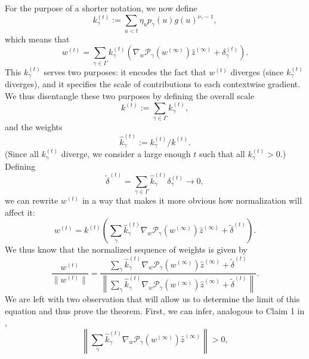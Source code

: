 \documentclass{article}
\theoremstyle{plain}
\theoremstyle{definition}
\theoremstyle{remark}
\begin{document}
For the purpose of a shorter notation, we now define
\begin{equation}
    k_{\gamma}^{(t)}:=\sum_{u<t}\eta_up_{\gamma}(u)g(u)^{\nu_{\gamma}-1},
\end{equation}
which means that
\begin{equation}
    w^{(t)}=\sum_{\gamma\in\Gamma}k^{(t)}_{\gamma}\left(\nabla_w\mathcal{P}_{\gamma}(w^{(\infty)})\hat{z}^{(\infty)}+\delta_{\gamma}^{(t)}\right).
\end{equation}
This $k^{(t)}_{\gamma}$ serves two purposes: it encodes the fact that $w^{(t)}$ diverges (since $k_{\gamma}^{(t)}$ diverges), and it specifies the scale of contributions to each contextwise gradient.
We thus disentangle these two purposes by defining the overall scale
\begin{equation}
    k^{(t)}:=\sum_{\gamma\in\Gamma}k_{\gamma}^{(t)},
\end{equation}
and the weights
\begin{equation}
    \hat{k}^{(t)}_{\gamma}:=k^{(t)}_{\gamma}/k^{(t)}.
\end{equation}
(Since all $k^{(t)}_{\gamma}$ diverge, we consider a large enough $t$ such that all $k_{\gamma}^{(t)}>0$.)
Defining
\begin{equation}
    \tilde{\delta}^{(t)}=\sum_{\gamma\in\Gamma}\hat{k}_{\gamma}^{(t)}\delta_{\gamma}^{(t)}\to 0,
\end{equation}
we can rewrite $w^{(t)}$ in a way that makes it more obvious how normalization will affect it:
\begin{equation}
    w^{(t)}=k^{(t)}\left(\sum_{\gamma}\hat{k}_{\gamma}^{(t)}\nabla_w\mathcal{P}_{\gamma}(w^{(\infty)})\hat{z}^{(\infty)}+\tilde{\delta}^{(t)}\right).
\end{equation}
We thus know that the normalized sequence of weights is given by
\begin{equation}
    \frac{w^{(t)}}{\|w^{(t)}\|}=\frac{\sum_{\gamma}\hat{k}_{\gamma}^{(t)}\nabla_w\mathcal{P}_{\gamma}(w^{(\infty)})\hat{z}^{(\infty)}+\tilde{\delta}^{(t)}}
    {\left\|\sum_{\gamma}\hat{k}_{\gamma}^{(t)}\nabla_w\mathcal{P}_{\gamma}(w^{(\infty)})\hat{z}^{(\infty)}+\tilde{\delta}^{(t)}\right\|}.
\end{equation}
We are left with two observation that will allow us to determine the limit of this equation and thus prove the theorem.
First, we can infer, analogous to Claim 1 in \citet{gunasekar_implicit_2018},
\begin{equation}
    \left\|\sum_{\gamma}\hat{k}_{\gamma}^{(t)}\nabla_w\mathcal{P}_{\gamma}(w^{(\infty)})\hat{z}^{(\infty)}\right\|>0,
\end{equation}
\end{document}
